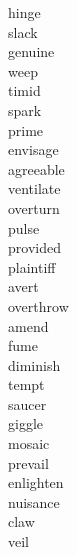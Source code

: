\documentclass[a4paper, 11pt]{ctexart}
\begin{document}
\begin{multicols*}{3}
\begin{description}
\item[hinge]

\item[slack]

\item[genuine]

\item[weep]

\item[timid]

\item[spark]

\item[prime]

\item[envisage]

\item[agreeable]

\item[ventilate]

\item[overturn]

\item[pulse]

\item[provided]

\item[plaintiff]

\item[avert]

\item[overthrow]

\item[amend]

\item[fume]

\item[diminish]

\item[tempt]

\item[saucer]

\item[giggle]

\item[mosaic]

\item[prevail]

\item[enlighten]

\item[nuisance]

\item[claw]

\item[veil]


\end{description}
\end{multicols*}
\end{document}
